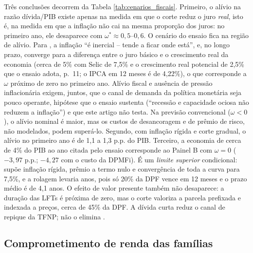 \documentclass[12pt,a4paper]{article}
\begin{document}
Três conclusões decorrem da Tabela \ref{tab:cenarios_fiscais}. Primeiro, o alívio na razão dívida/PIB existe apenas na medida em que o corte reduz o juro \emph{real}, isto é, na medida em que a inflação não cai na mesma proporção dos juros: no primeiro ano, ele desaparece com $\omega^* \approx 0{,}5$--$0{,}6$. O cenário do ensaio fica na região de alívio. Para \citet[p.~9]{resende2026euacuso}, a inflação ``é inercial -- tende a ficar onde está'', e, no longo prazo, converge para a diferença entre o juro básico e o crescimento real da economia (cerca de 5\% com Selic de 7,5\% e o crescimento real potencial de 2,5\% que o ensaio adota, p.~11; o IPCA em 12 meses é de 4,22\%), o que corresponde a $\omega$ próximo de zero no primeiro ano. Alívio fiscal e ausência de pressão inflacionária exigem, juntos, que o canal de demanda da política monetária seja pouco operante, hipótese que o ensaio sustenta (``recessão e capacidade ociosa não reduzem a inflação'') e que este artigo não testa. Na previsão convencional ($\omega < 0$), o alívio nominal é maior, mas os custos de desancoragem e de prêmio de risco, não modelados, podem superá-lo. Segundo, com inflação rígida e corte gradual, o alívio no primeiro ano é de 1,1 a 1,3 p.p. do PIB. Terceiro, a economia de cerca de 4\% do PIB ao ano citada pelo ensaio \citep[p.~11]{resende2026euacuso} corresponde ao Painel B com $\omega = 0$ ($-3{,}97$ p.p.; $-4{,}27$ com o custo da DPMFi). É um \emph{limite superior} condicional: supõe inflação rígida, prêmio a termo nulo e convergência de toda a curva para 7,5\%, e a rolagem levaria anos, pois só 20\% da DPF vence em 12 meses e o prazo médio é de 4,1 anos. O efeito de valor presente também não desaparece: a duração das LFTs é próxima de zero, mas o corte valoriza a parcela prefixada e indexada a preços, cerca de 45\% da DPF. A dívida curta reduz o canal de repique da TFNP; não o elimina \citep{cochrane2001long, sims2011stepping, cochrane2023fiscal}.

\subsection{Comprometimento de renda das famílias}
\end{document}
